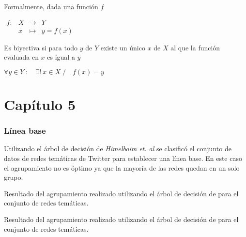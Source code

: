 Formalmente, dada una función $f$

$ {\begin{array}{rccl}f:&X&\longrightarrow &Y\\&x&\longmapsto &y=f(x)\end{array}} $

Es biyectiva si para todo $y$ de $Y$ existe un único $x$ de $X$ al que la función evaluada en $x$ es igual a $y$

$ \forall y\in Y\;:\quad \exists !\ x\in X\;/\quad f(x)=y $

\section{Capítulo 5}
\label{sec:appendix:c3}

\subsubsection{Línea base}
\label{sec:appendix:baseline}

Utilizando el árbol de decisión de \textit{Himelboim et. al} \cite{himelboim_classifying_2017} se clasificó el conjunto de datos de redes temáticas de Twitter para establecer una línea base. En este caso el agrupamiento no es óptimo ya que la mayoría de las redes quedan en un solo grupo.

\begin{table}[h]
\begin{center}
    \caption{Resultado del agrupamiento realizado utilizando el árbol de decisión de \cite{himelboim_classifying_2017} para el conjunto de redes temáticas.}
\end{center}
\end{table}

\begin{table}[h]
\begin{center}
    \caption{Resultado del agrupamiento realizado utilizando el árbol de decisión de \cite{himelboim_classifying_2017} para el conjunto de redes temáticas.}
\end{center}
\end{table}